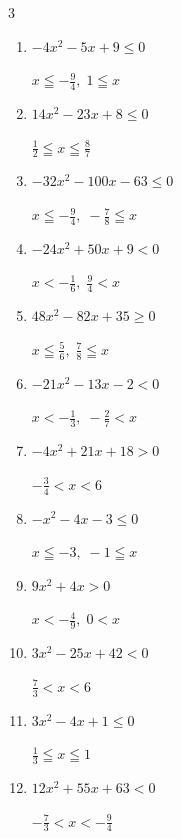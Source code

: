 \begin{multicols}{3}
\begin{enumerate}
        $\displaystyle \frac{1}{6} \leqq x \leqq \frac{1}{3}$

  \item $-4x^{2}-5x+9\leq 0$

        $\displaystyle x \leqq -\frac{9}{4} , \; 1 \leqq x$

  \item $14x^{2}-23x+8\leq 0$

        $\displaystyle \frac{1}{2} \leqq x \leqq \frac{8}{7}$

  \item $-32x^{2}-100x-63\leq 0$

        $\displaystyle x \leqq -\frac{9}{4} , \; -\frac{7}{8} \leqq x$

\columnbreak %

  \item $-24x^{2}+50x+9<0$

        $\displaystyle x < -\frac{1}{6} , \; \frac{9}{4} < x$

  \item $48x^{2}-82x+35\geq 0$

        $\displaystyle x \leqq \frac{5}{6} , \; \frac{7}{8} \leqq x$

  \item $-21x^{2}-13x-2<0$

        $\displaystyle x < -\frac{1}{3} , \; -\frac{2}{7} < x$

  \item $-4x^{2}+21x+18>0$

        $\displaystyle -\frac{3}{4} < x < 6$

  \item $-x^{2}-4x-3\leq 0$

        $\displaystyle x \leqq -3 , \; -1 \leqq x$

  \item $9x^{2}+4x>0$

        $\displaystyle x < -\frac{4}{9} , \; 0 < x$

  \item $3x^{2}-25x+42<0$

        $\displaystyle \frac{7}{3} < x < 6$

  \item $3x^{2}-4x+1\leq 0$

        $\displaystyle \frac{1}{3} \leqq x \leqq 1$

  \item $12x^{2}+55x+63<0$

        $\displaystyle -\frac{7}{3} < x < -\frac{9}{4}$


\end{enumerate}
\end{multicols}
